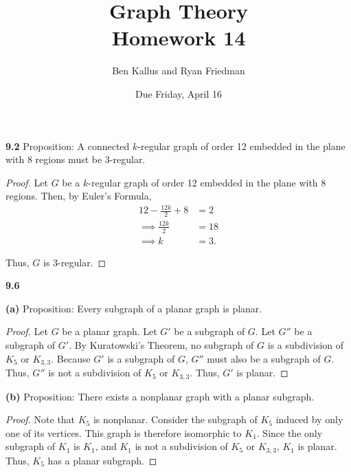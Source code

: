 \documentclass[12pt]{article}
\title{Graph Theory \\ Homework 14}
\author{Ben Kallus and Ryan Friedman}
\date{Due Friday, April 16}
\begin{document}
\maketitle

\medskip\noindent\textbf{9.2} Proposition: A connected $k$-regular graph of order 12 embedded in the plane with 8 regions must be 3-regular.
\begin{proof}
    Let $G$ be a $k$-regular graph of order 12 embedded in the plane with 8 regions.
    Then, by Euler's Formula,
    \begin{align*}
        12 - \frac{12k}2 + 8 &= 2 \\
        \implies \frac{12k}2 &= 18 \\
        \implies k &= 3.
    \end{align*}

    Thus, $G$ is 3-regular.
\end{proof}

\newpage\noindent\textbf{9.6}

\textbf{(a)} Proposition: Every subgraph of a planar graph is planar.
\begin{proof}
    Let $G$ be a planar graph.
    Let $G'$ be a subgraph of $G$.
    Let $G''$ be a subgraph of $G'$.
    By Kuratowski's Theorem, no subgraph of $G$ is a subdivision of $K_5$ or $K_{3,3}$.
    Because $G'$ is a subgraph of $G$, $G''$ must also be a subgraph of $G$.
    Thus, $G''$ is not a subdivision of $K_5$ or $K_{3,3}$.
    Thus, $G'$ is planar.
\end{proof}

\textbf{(b)} Proposition: There exists a nonplanar graph with a planar subgraph.
\begin{proof}
    Note that $K_5$ is nonplanar.
    Consider the subgraph of $K_5$ induced by only one of its vertices.
    This graph is therefore isomorphic to $K_1$.
    Since the only subgraph of $K_1$ is $K_1$, and $K_1$ is not a subdivision of $K_5$ or $K_{3,3}$, $K_1$ is planar.
    Thus, $K_5$ has a planar subgraph.
\end{proof}
\end{document}
